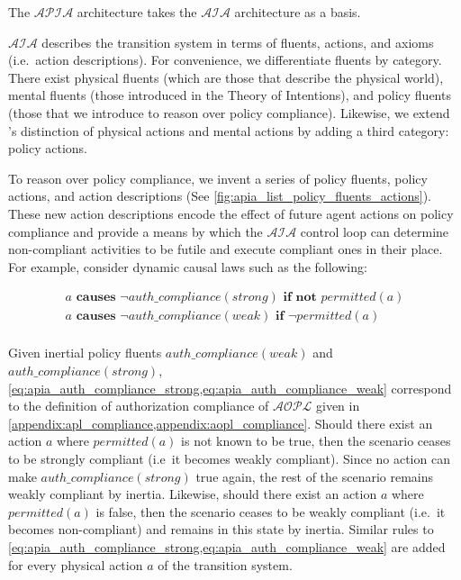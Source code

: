 The $\mathcal{APIA}$ architecture takes the $\mathcal{AIA}$ architecture as a basis.

$\mathcal{AIA}$ describes the transition system in terms of fluents, actions, and axioms (i.e.~action descriptions).
For convenience, we differentiate fluents by category.
There exist physical fluents (which are those that describe the physical world), mental fluents (those introduced in the Theory of Intentions), and policy fluents (those that we introduce to reason over policy compliance).
Likewise, we extend \citet{blount_architecture_2013,blount_towards_2014}'s distinction of physical actions and mental actions by adding a third category: policy actions.

To reason over policy compliance, we invent a series of policy fluents, policy actions, and action descriptions (See \cref{fig:apia_list_policy_fluents_actions}).
These new action descriptions encode the effect of future agent actions on policy compliance and provide a means by which the $\mathcal{AIA}$ control loop can determine non-compliant activities to be futile and execute compliant ones in their place.
For example, consider dynamic causal laws such as the following:

\begin{gather}
    \label{eq:apia_auth_compliance_strong}
    a \textbf{ causes } \neg auth\_compliance(strong) \textbf{ if not } permitted(a) \\
    \label{eq:apia_auth_compliance_weak}
    a \textbf{ causes } \neg auth\_compliance(weak) \textbf{ if } \neg permitted(a) \\
\end{gather}

Given inertial policy fluents $auth\_compliance(weak)$ and $auth\_compliance(strong)$, \cref{eq:apia_auth_compliance_strong,eq:apia_auth_compliance_weak} correspond to the definition of authorization compliance of $\mathcal{AOPL}$ given in \cref{appendix:apl_compliance,appendix:aopl_compliance}.
Should there exist an action $a$ where $permitted(a)$ is not known to be true, then the scenario ceases to be strongly compliant (i.e~it becomes weakly compliant).
Since no action can make $auth\_compliance(strong)$ true again, the rest of the scenario remains weakly compliant by inertia.
Likewise, should there exist an action $a$ where $permitted(a)$ is false, then the scenario ceases to be weakly compliant (i.e.~it becomes non-compliant) and remains in this state by inertia.
Similar rules to \cref{eq:apia_auth_compliance_strong,eq:apia_auth_compliance_weak} are added for every physical action $a$ of the transition system.

